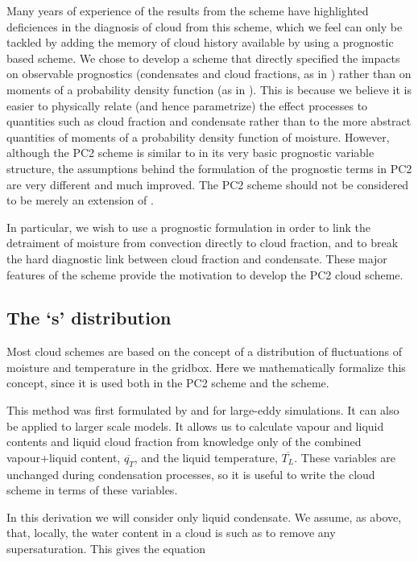 \documentclass{UMDP_article}
\begin{document}
Many years of experience of the results from the \cite{smith90} 
scheme have highlighted deficiences in the diagnosis of cloud from
this scheme, which we feel can only be tackled by adding the
memory of cloud history available by using a prognostic based
scheme. We chose to develop a scheme that directly specified
the impacts on observable prognostics (condensates and
cloud fractions, as in \cite{t93}) rather than on moments of a
probability density function (as in \cite{t02}). This is because
we believe it is easier to physically relate (and hence parametrize)
the effect processes to quantities
such as cloud fraction and condensate rather than to the more abstract
quantities of moments of a probability
density function of moisture. However, although the
PC2 scheme is similar to \cite{t93} in its very basic prognostic variable
structure, the assumptions behind the formulation of the prognostic terms
in PC2 are very different and much improved. The PC2 scheme should not be
considered to be merely an extension of \cite{t93}.

In particular, we wish to use a prognostic formulation in order to link
the detraiment of moisture from convection directly to cloud fraction, and
to break the hard diagnostic link between cloud fraction and condensate. These
major features of the \cite{t93} scheme provide the motivation to develop
the PC2 cloud scheme.

\subsection{The `s' distribution}
\label{sec:s_dist}

Most cloud schemes are based on the concept of a distribution
of fluctuations of moisture and temperature in the gridbox. Here we
mathematically formalize this concept, since it is used both in
the PC2 scheme and the \cite{smith90} scheme.

This method was first formulated by \cite{m77} and \cite{sommeria_deardorff_1977} 
for large-eddy simulations. It can also be applied
to larger scale models. It allows us to calculate vapour and liquid
contents and liquid cloud fraction from knowledge only of the combined
vapour+liquid content, $\overline{q_T}$, and the liquid temperature,
$\overline{T_L}$. These variables are unchanged during condensation
processes, so it is useful to write the cloud scheme in terms of these
variables.

In this derivation we will consider only liquid condensate.
We assume, as above, that,
locally, the water content in a cloud is such as to remove any
supersaturation. This gives the equation
\end{document}
